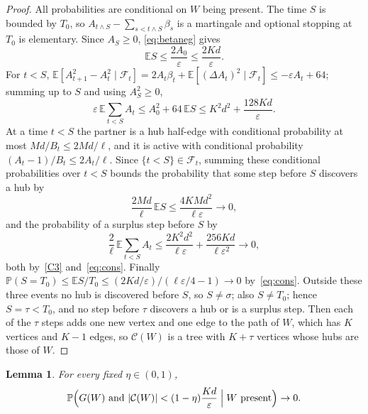 \documentclass[11pt]{amsart}
\newtheorem{lemma}[theorem]{Lemma}
\theoremstyle{definition}
\theoremstyle{remark}
\numberwithin{equation}{section}
\newcommand{\PP}{\mathbb P}
\newcommand{\E}{\mathbb E}
\newcommand{\eps}{\varepsilon}
\newcommand{\cF}{\mathcal F}
\newcommand{\cC}{\mathcal C}
\begin{document}
\begin{proof}
All probabilities are conditional on $W$ being present. The time $S$ is bounded by $T_0$, so $A_{t\wedge S}-\sum_{s<t\wedge S}\beta_s$ is a martingale and optional stopping at $T_0$ is elementary. Since $A_S\ge0$, \eqref{eq:betaneg} gives
\begin{equation}\label{eq:ES}
\E S\le\frac{2A_0}{\eps}\le\frac{2Kd}{\eps}.
\end{equation}
For $t<S$, $\E[A_{t+1}^2-A_t^2\mid\cF_t]=2A_t\beta_t+\E[(\Delta A_t)^2\mid\cF_t]\le-\eps A_t+64$; summing up to $S$ and using $A_S^2\ge0$,
\begin{equation}\label{eq:area}
\eps\,\E\sum_{t<S}A_t\le A_0^2+64\,\E S\le K^2d^2+\frac{128Kd}{\eps}.
\end{equation}
At a time $t<S$ the partner is a hub half-edge with conditional probability at most $Md/B_t\le2Md/\ell$, and it is active with conditional probability $(A_t-1)/B_t\le2A_t/\ell$. Since $\{t<S\}\in\cF_t$, summing these conditional probabilities over $t<S$ bounds the probability that some step before $S$ discovers a hub by
\[
\frac{2Md}{\ell}\,\E S\le\frac{4KMd^2}{\ell\eps}\to0,
\]
and the probability of a surplus step before $S$ by
\[
\frac2\ell\,\E\sum_{t<S}A_t\le\frac{2K^2d^2}{\ell\eps}+\frac{256Kd}{\ell\eps^2}\to0,
\]
both by~\ref{C3} and~\eqref{eq:cons}. Finally $\PP(S=T_0)\le\E S/T_0\le(2Kd/\eps)/(\ell\eps/4-1)\to0$ by~\eqref{eq:cons}. Outside these three events no hub is discovered before $S$, so $S\ne\sigma$; also $S\ne T_0$; hence $S=\tau<T_0$, and no step before $\tau$ discovers a hub or is a surplus step. Then each of the $\tau$ steps adds one new vertex and one edge to the path of $W$, which has $K$ vertices and $K-1$ edges, so $\cC(W)$ is a tree with $K+\tau$ vertices whose hubs are those of $W$.
\end{proof}

\begin{lemma}\label{lem:size}
For every fixed $\eta\in(0,1)$,
\[
\PP\Bigl(G(W)\ \text{and}\ |\cC(W)|<(1-\eta)\frac{Kd}{\eps}\Bigm| W\text{ present}\Bigr)\to0 .
\]
\end{lemma}
\end{document}
